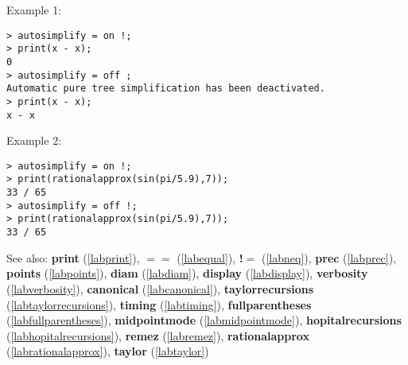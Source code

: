 \noindent Example 1: 
\begin{center}\begin{minipage}{15cm}\begin{Verbatim}[frame=single]
> autosimplify = on !;
> print(x - x);
0
> autosimplify = off ;
Automatic pure tree simplification has been deactivated.
> print(x - x);
x - x
\end{Verbatim}
\end{minipage}\end{center}
\noindent Example 2: 
\begin{center}\begin{minipage}{15cm}\begin{Verbatim}[frame=single]
> autosimplify = on !; 
> print(rationalapprox(sin(pi/5.9),7));
33 / 65
> autosimplify = off !; 
> print(rationalapprox(sin(pi/5.9),7));
33 / 65
\end{Verbatim}
\end{minipage}\end{center}
See also: \textbf{print} (\ref{labprint}), \textbf{$==$} (\ref{labequal}), \textbf{!$=$} (\ref{labneq}), \textbf{prec} (\ref{labprec}), \textbf{points} (\ref{labpoints}), \textbf{diam} (\ref{labdiam}), \textbf{display} (\ref{labdisplay}), \textbf{verbosity} (\ref{labverbosity}), \textbf{canonical} (\ref{labcanonical}), \textbf{taylorrecursions} (\ref{labtaylorrecursions}), \textbf{timing} (\ref{labtiming}), \textbf{fullparentheses} (\ref{labfullparentheses}), \textbf{midpointmode} (\ref{labmidpointmode}), \textbf{hopitalrecursions} (\ref{labhopitalrecursions}), \textbf{remez} (\ref{labremez}), \textbf{rationalapprox} (\ref{labrationalapprox}), \textbf{taylor} (\ref{labtaylor})
